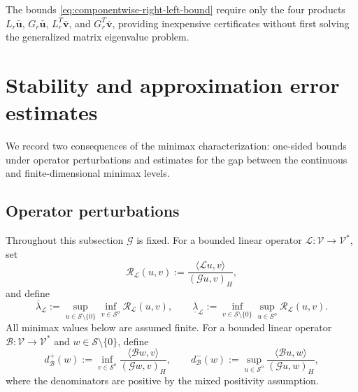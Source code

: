 \documentclass[preprint,10pt]{elsarticle}
\theoremstyle{plain}
\theoremstyle{definition}
\theoremstyle{remark}
\begin{document}
The bounds \eqref{eq:componentwise-right-left-bound} require only the four
products $L_r\bar{\mathbf{u}}$, $G_r\bar{\mathbf{u}}$, $L_r^T\bar{\mathbf{v}}$,
and $G_r^T\bar{\mathbf{v}}$, providing inexpensive certificates without first
solving the generalized matrix eigenvalue problem.

\section{Stability and approximation error estimates}
\label{sec:stability}

We record two consequences of the minimax characterization: one-sided
bounds under operator perturbations and estimates for the gap between the
continuous and finite-dimensional minimax levels.

\subsection{Operator perturbations}

Throughout this subsection \(\mathcal G\) is fixed. For a bounded linear
operator \(\mathcal L:\mathcal V\to\mathcal V^*\), set
\[
\mathcal R_{\mathcal L}(u,v)
:=
\frac{\langle \mathcal L u,v\rangle}{(\mathcal G u,v)_H},
\]
and define
\[
\overline\lambda_{\mathcal L}
:=
\sup_{u\in\mathcal S\setminus\{0\}}
\inf_{v\in\mathcal S^o}
\mathcal R_{\mathcal L}(u,v),
\qquad
\underline\lambda_{\mathcal L}
:=
\inf_{v\in\mathcal S\setminus\{0\}}
\sup_{u\in\mathcal S^o}
\mathcal R_{\mathcal L}(u,v).
\]
All minimax values below are assumed finite. For a bounded linear operator
\(\mathcal B:\mathcal V\to\mathcal V^*\) and
\(w\in\mathcal S\setminus\{0\}\), define
\begin{equation}\label{eq:dpm-G}
	d^+_{\mathcal B}(w)
	:=
	\inf_{v\in\mathcal S^o}
	\frac{\langle \mathcal B w,v\rangle}{(\mathcal G w,v)_H},
	\qquad
	d^-_{\mathcal B}(w)
	:=
	\sup_{u\in\mathcal S^o}
	\frac{\langle \mathcal B u,w\rangle}{(\mathcal G u,w)_H},
\end{equation}
where the denominators are positive by the mixed positivity assumption.
\end{document}
